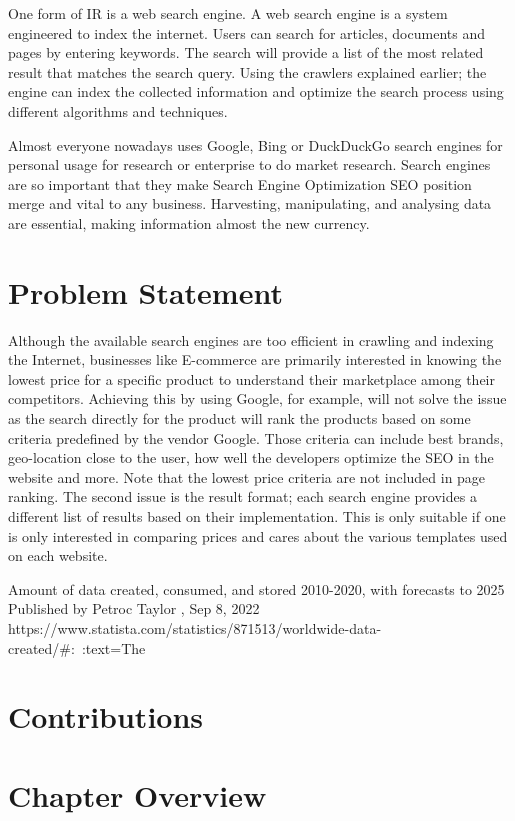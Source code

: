 One form of IR is a web search engine. A web search engine is a system engineered to index the internet. Users can search for articles, documents and pages by entering keywords. The search will provide a list of the most related result that matches the search query. Using the crawlers explained earlier; the engine can index the collected information and optimize the search process using different algorithms and techniques. 

Almost everyone nowadays uses Google, Bing or DuckDuckGo search engines for personal usage for research or enterprise to do market research. Search engines are so important that they make Search Engine Optimization SEO position merge and vital to any business. Harvesting, manipulating, and analysing data are essential, making information almost the new currency. 

\section{Problem Statement}
Although the available search engines are too efficient in crawling and indexing the Internet, businesses like E-commerce are primarily interested in knowing the lowest price for a specific product to understand their marketplace among their competitors. Achieving this by using Google, for example, will not solve the issue as the search directly for the product will rank the products based on some criteria predefined by the vendor Google. Those criteria can include best brands, geo-location close to the user, how well the developers optimize the SEO in the website and more. Note that the lowest price criteria are not included in page ranking. The second issue is the result format; each search engine provides a different list of results based on their implementation. This is only suitable if one is only interested in comparing prices and cares about the various templates used on each website.  

Amount of data created, consumed, and stored 2010-2020, with forecasts to 2025
Published by 
Petroc Taylor
, Sep 8, 2022
https://www.statista.com/statistics/871513/worldwide-data-created/#:~:text=The%
\section{Contributions}
\section{Chapter Overview}
